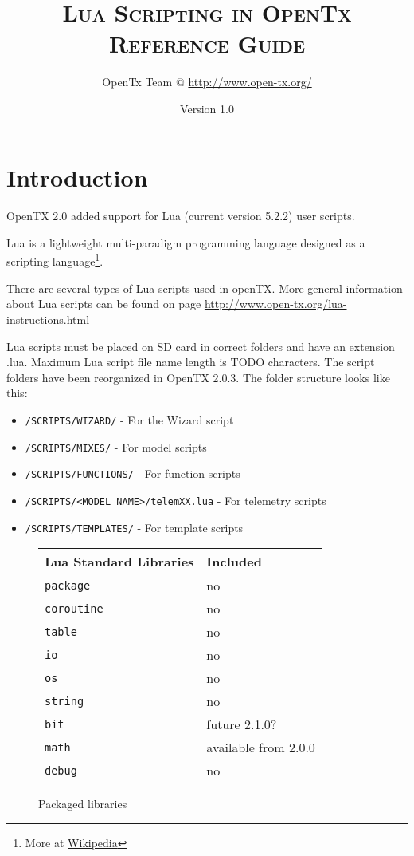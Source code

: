 \documentclass[a4paper,french,10pt]{article}
\title {
\vspace{60mm}
\Huge{\textsc{Lua Scripting in OpenTx\\}
\vspace{8mm}
\LARGE{\textsc{Reference Guide}}}
\vspace{45mm}
}
\author{OpenTx Team @ \url{http://www.open-tx.org/}}
\date{Version 1.0}
\begin{document}
\maketitle
\newpage

\tableofcontents
\newpage

\section{Introduction}
\paragraph{}
OpenTX 2.0 added support for Lua (current version 5.2.2) user scripts.

Lua is a lightweight multi-paradigm programming language designed as a scripting language\footnote{More at \href{http://www.wikipedia.org}{Wikipedia}}. 

There are several types of Lua scripts used in openTX. More general information about Lua scripts can be found on page \url{http://www.open-tx.org/lua-instructions.html}

Lua scripts must be placed on SD card in correct folders and have an extension .lua. Maximum Lua script file name length is TODO characters. The script folders have been reorganized in OpenTX 2.0.3. The folder structure looks like this: 

\begin{itemize}[leftmargin=*,itemsep=5mm,nolistsep]
\item[] \texttt{/SCRIPTS/WIZARD/} - For the Wizard script
\item[] \texttt{/SCRIPTS/MIXES/} - For model scripts
\item[] \texttt{/SCRIPTS/FUNCTIONS/} - For function scripts
\item[] \texttt{/SCRIPTS/<MODEL\_NAME>/telemXX.lua} - For telemetry scripts
\item[] \texttt{/SCRIPTS/TEMPLATES/} - For template scripts
\end{itemize}

\begin{figure}[h]
\begin{center}
\begin{longtable}{ll}
\toprule
\textbf{Lua Standard Libraries} & \textbf{Included} \\
\midrule
\endhead
\texttt{package} & no \\
\texttt{coroutine} & no \\
\texttt{table} & no \\
\texttt{io} & no \\
\texttt{os} & no \\
\texttt{string} & no \\
\texttt{bit} & future 2.1.0? \\
\texttt{math} & available from 2.0.0\\
\texttt{debug} & no \\
\bottomrule
\end{longtable}
\caption{Packaged libraries}
\end{center}
\end{figure}
\newpage
\end{document}
